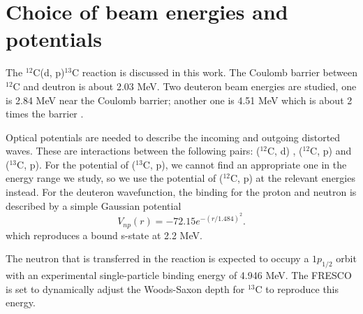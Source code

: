 \section{Choice of beam energies and potentials} \label{part1}
	The $^{12}$C(d, p)$^{13}$C reaction is discussed in this work. 
	The Coulomb barrier between $^{12}$C and deutron is about 2.03 MeV.
	Two deuteron beam energies are studied, one is 2.84 MeV near the Coulomb barrier; another one is 4.51 MeV which is about 2 times the barrier .
	
	Optical potentials are needed to describe the incoming and outgoing distorted waves.  
	These are interactions between the following pairs: ($^{12}$C, d) \cite{PhysRevC.73.054605}, ($^{12}$C, p) \cite{PTCOG} and ($^{13}$C, p). 
	For the potential of ($^{13}$C, p), we cannot find an appropriate one in the energy range we study, 
	so we use the potential of ($^{12}$C, p) at the relevant energies instead. 
	For the deuteron wavefunction, the binding for the proton and neutron is described by a simple Gaussian potential 
	\begin{equation}
		V_{np}(r)=-72.15e^{-(r/1.484)^2}.
	\end{equation}
	which reproduces a bound s-state at 2.2 MeV.
	
	The neutron that is transferred in the reaction is expected to occupy a $1p_{1/2}$ orbit with an experimental single-particle binding energy of 4.946 MeV. 
	The FRESCO is set to dynamically adjust the Woods-Saxon depth for $^{13}$C to reproduce this energy.
	
	